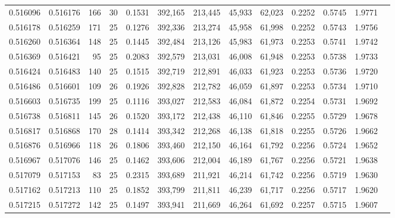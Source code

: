 \begin{tabular}{rrrrrrrrrrrrr}
0.516096 & 0.516176 & 166 &  30 &                                     0.1531 & 392,165 & 213,445 &  45,933 &  62,023 & 0.2252 & 0.5745 & 1.9771 \\
0.516178 & 0.516259 & 171 &  25 &                                     0.1276 & 392,336 & 213,274 &  45,958 &  61,998 & 0.2252 & 0.5743 & 1.9756 \\
0.516260 & 0.516364 & 148 &  25 &                                     0.1445 & 392,484 & 213,126 &  45,983 &  61,973 & 0.2253 & 0.5741 & 1.9742 \\
0.516369 & 0.516421 &  95 &  25 &                                     0.2083 & 392,579 & 213,031 &  46,008 &  61,948 & 0.2253 & 0.5738 & 1.9733 \\
0.516424 & 0.516483 & 140 &  25 &                                     0.1515 & 392,719 & 212,891 &  46,033 &  61,923 & 0.2253 & 0.5736 & 1.9720 \\
0.516486 & 0.516601 & 109 &  26 &                                     0.1926 & 392,828 & 212,782 &  46,059 &  61,897 & 0.2253 & 0.5734 & 1.9710 \\
0.516603 & 0.516735 & 199 &  25 &                                     0.1116 & 393,027 & 212,583 &  46,084 &  61,872 & 0.2254 & 0.5731 & 1.9692 \\
0.516738 & 0.516811 & 145 &  26 &                                     0.1520 & 393,172 & 212,438 &  46,110 &  61,846 & 0.2255 & 0.5729 & 1.9678 \\
0.516817 & 0.516868 & 170 &  28 &                                     0.1414 & 393,342 & 212,268 &  46,138 &  61,818 & 0.2255 & 0.5726 & 1.9662 \\
0.516876 & 0.516966 & 118 &  26 &                                     0.1806 & 393,460 & 212,150 &  46,164 &  61,792 & 0.2256 & 0.5724 & 1.9652 \\
0.516967 & 0.517076 & 146 &  25 &                                     0.1462 & 393,606 & 212,004 &  46,189 &  61,767 & 0.2256 & 0.5721 & 1.9638 \\
0.517079 & 0.517153 &  83 &  25 &                                     0.2315 & 393,689 & 211,921 &  46,214 &  61,742 & 0.2256 & 0.5719 & 1.9630 \\
0.517162 & 0.517213 & 110 &  25 &                                     0.1852 & 393,799 & 211,811 &  46,239 &  61,717 & 0.2256 & 0.5717 & 1.9620 \\
0.517215 & 0.517272 & 142 &  25 &                                     0.1497 & 393,941 & 211,669 &  46,264 &  61,692 & 0.2257 & 0.5715 & 1.9607 \\

\end{tabular}
